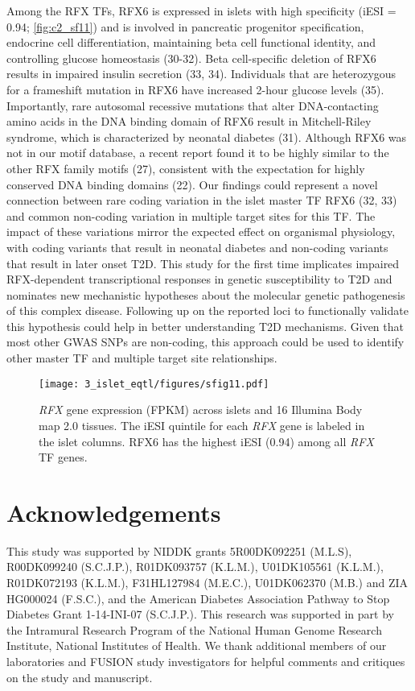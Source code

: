 Among the RFX TFs, RFX6 is expressed in islets with high specificity (iESI = 0.94; \ref{fig:c2_sf11}) and is involved in pancreatic progenitor specification, endocrine cell differentiation, maintaining beta cell functional identity, and controlling glucose homeostasis (30-32). Beta cell-specific deletion of RFX6 results in impaired insulin secretion (33, 34). Individuals that are heterozygous for a frameshift mutation in RFX6 have increased 2-hour glucose levels (35). Importantly, rare autosomal recessive mutations that alter DNA-contacting amino acids in the DNA binding domain of RFX6 result in Mitchell-Riley syndrome, which is characterized by neonatal diabetes (31). Although RFX6 was not in our motif database, a recent report found it to be highly similar to the other RFX family motifs (27), consistent with the expectation for highly conserved DNA binding domains (22). Our findings could represent a novel connection between rare coding variation in the islet master TF RFX6 (32, 33) and common non-coding variation in multiple target sites for this TF. The impact of these variations mirror the expected effect on organismal physiology, with coding variants that result in neonatal diabetes and non-coding variants that result in later onset T2D. This study for the first time implicates impaired RFX-dependent transcriptional responses in genetic susceptibility to T2D and nominates new mechanistic hypotheses about the molecular genetic pathogenesis of this complex disease. Following up on the reported loci to functionally validate this hypothesis could help in better understanding T2D mechanisms. Given that most other GWAS SNPs are non-coding, this approach could be used to identify other master TF and multiple target site relationships.

\begin{figure}
    \centering
    \texttt{[image: 3\_islet\_eqtl/figures/sfig11.pdf]}
    \caption{\textit{RFX} gene expression (FPKM) across islets and 16 Illumina Body map 2.0 tissues. The iESI quintile for each \textit{RFX} gene is labeled in the islet columns. RFX6 has the highest iESI (0.94) among all \textit{RFX} TF genes.}
    \label{fig:c2_sf1}
\end{figure}

\section{Acknowledgements}
This study was supported by NIDDK grants 5R00DK092251 (M.L.S), R00DK099240 (S.C.J.P.), R01DK093757 (K.L.M.), U01DK105561 (K.L.M.), R01DK072193 (K.L.M.), F31HL127984 (M.E.C.), U01DK062370 (M.B.) and ZIA HG000024 (F.S.C.), and the American Diabetes Association Pathway to Stop Diabetes Grant 1-14-INI-07 (S.C.J.P.). This research was supported in part by the Intramural Research Program of the National Human Genome Research Institute, National Institutes of Health. We thank additional members of our laboratories and FUSION study investigators for helpful comments and critiques on the study and manuscript.



